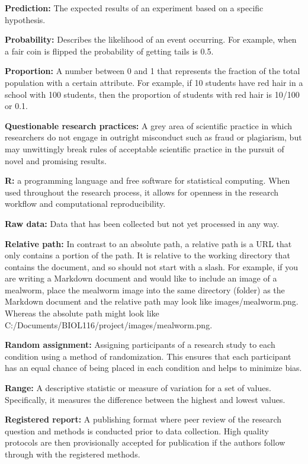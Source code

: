 \documentclass[
]{book}
\begin{document}
\textbf{Prediction:} The expected results of an experiment based on a specific hypothesis.

\textbf{Probability:} Describes the likelihood of an event occurring. For example, when a fair coin is flipped the probability of getting tails is 0.5.

\textbf{Proportion:} A number between 0 and 1 that represents the fraction of the total population with a certain attribute. For example, if 10 students have red hair in a school with 100 students, then the proportion of students with red hair is 10/100 or 0.1.

\textbf{Questionable research practices:} A grey area of scientific practice in which researchers do not engage in outright misconduct such as fraud or plagiarism, but may unwittingly break rules of acceptable scientific practice in the pursuit of novel and promising results.

\textbf{R:} a programming language and free software for statistical computing. When used throughout the research process, it allows for openness in the research workflow and computational reproducibility.

\textbf{Raw data:} Data that has been collected but not yet processed in any way.

\textbf{Relative path:} In contrast to an absolute path, a relative path is a URL that only contains a portion of the path. It is relative to the working directory that contains the document, and so should not start with a slash. For example, if you are writing a Markdown document and would like to include an image of a mealworm, place the mealworm image into the same directory (folder) as the Markdown document and the relative path may look like images/mealworm.png. Whereas the absolute path might look like C:/Documents/BIOL116/project/images/mealworm.png.

\textbf{Random assignment:} Assigning participants of a research study to each condition using a method of randomization. This ensures that each participant has an equal chance of being placed in each condition and helps to minimize bias.

\textbf{Range:} A descriptive statistic or measure of variation for a set of values. Specifically, it measures the difference between the highest and lowest values.

\textbf{Registered report:} A publishing format where peer review of the research question and methods is conducted prior to data collection. High quality protocols are then provisionally accepted for publication if the authors follow through with the registered methods.
\end{document}

